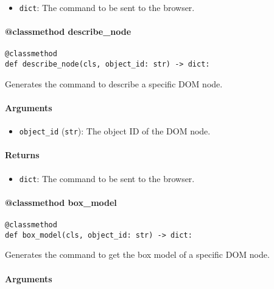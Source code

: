 \documentclass{article}
\begin{document}
\begin{itemize}
    \item \lstinline[style=pythonstyle]|dict|: The command to be sent to the browser.
\end{itemize}

\paragraph{@classmethod describe\_node}

\begin{lstlisting}[style=pythonstyle]
@classmethod
def describe_node(cls, object_id: str) -> dict:
\end{lstlisting}

\noindent Generates the command to describe a specific DOM node.

\paragraph{Arguments}

\begin{itemize}
    \item \lstinline[style=pythonstyle]|object_id| (\lstinline[style=pythonstyle]|str|): The object ID of the DOM node.
\end{itemize}

\paragraph{Returns}

\begin{itemize}
    \item \lstinline[style=pythonstyle]|dict|: The command to be sent to the browser.
\end{itemize}

\paragraph{@classmethod box\_model}

\begin{lstlisting}[style=pythonstyle]
@classmethod
def box_model(cls, object_id: str) -> dict:
\end{lstlisting}

\noindent Generates the command to get the box model of a specific DOM node.

\paragraph{Arguments}
\end{document}
